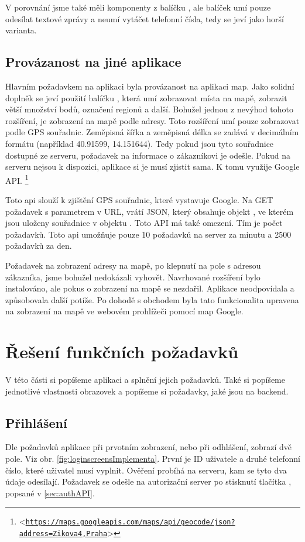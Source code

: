 \documentclass[11pt,twoside,a4paper]{book}
\let\oldUrl\url									%
\renewcommand\url[1]{<\texttt{\oldUrl{#1}}>}
\begin{document}
V porovnání jsme také měli komponenty z balíčku , ale balíček umí pouze odesílat textové zprávy a neumí vytáčet telefonní čísla, tedy se jeví jako horší varianta.

\subsection{Provázanost na jiné aplikace}
Hlavním požadavkem na aplikaci byla provázanost na aplikaci map. Jako solidní doplněk se jeví použití balíčku , která umí zobrazovat místa na mapě, zobrazit větší množství bodů, označení regionů a další. Bohužel jednou z nevýhod tohoto rozšíření, je zobrazení na mapě podle adresy. Toto rozšíření umí pouze zobrazovat podle GPS souřadnic. Zeměpisná šířka a zeměpisná délka se zadává v decimálním formátu (například 40.91599, 14.151644). Tedy pokud jsou tyto souřadnice dostupné ze serveru, požadavek na informace o zákazníkovi je odešle. Pokud na serveru nejsou k dispozici, aplikace si je musí zjistit sama. K tomu využije Google API. \footnote{\url{https://maps.googleapis.com/maps/api/geocode/json?address=Zikova4,Praha}}

Toto api slouží k zjištění GPS souřadnic, které vystavuje Google. Na GET požadavek s parametrem  v URL, vrátí JSON, který obsahuje objekt , ve kterém jsou uloženy souřadnice v objektu . Toto API má také omezení. Tím je počet požadavků. Toto api umožňuje pouze 10 požadavků na server za minutu a 2500 požadavků za den. \cite{googleMaps}

Požadavek na zobrazení adresy na mapě, po klepnutí na pole s adresou zákazníka, jsme bohužel nedokázali vyhovět. Navrhované rozšíření bylo instalováno, ale pokus o zobrazení na mapě se nezdařil. Aplikace neodpovídala a způsobovala další potíže. Po dohodě s obchodem byla tato funkcionalita upravena na zobrazení na mapě ve webovém prohlížeči pomocí map Google.

\section{Řešení funkčních požadavků}
V této části si popíšeme aplikaci a splnění jejich požadavků. Také si popíšeme jednotlivé vlastnosti obrazovek a popíšeme si požadavky, jaké jsou na backend.

\subsection{Přihlášení}
Dle požadavků aplikace při prvotním zobrazení, nebo při odhlášení, zobrazí dvě pole. Viz obr. \ref{fig:loginscreensImplementa}. První je ID uživatele a druhé telefonní číslo, které uživatel musí vyplnit. Ověření probíhá na serveru, kam se tyto dva údaje odesílají. Požadavek se odešle na autorizační server po stisknutí tlačítka , popsané v \ref{sec:authAPI}.
\end{document}
